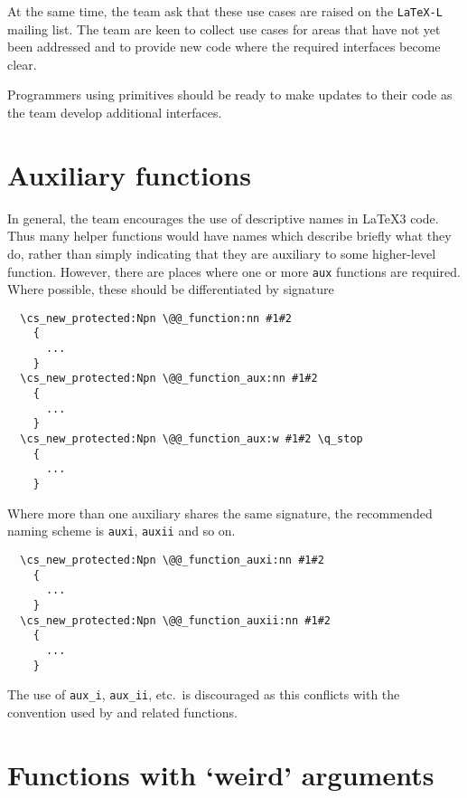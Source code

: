 \documentclass{l3doc}
\begin{document}
At the same time, the team ask that these use cases are raised on the
\texttt{LaTeX-L} mailing list. The team are keen to collect use cases for
areas that have not yet been addressed and to provide new code where the
required interfaces become clear.

Programmers using primitives should be ready to make updates to their
code as the team develop additional interfaces.

\section{Auxiliary functions}

In general, the team encourages the use of descriptive names in \LaTeX3 code.
Thus many helper functions would have names which describe briefly what they do,
rather than simply indicating that they are auxiliary to some higher-level
function. However, there are places where one or more \texttt{aux} functions
are required. Where possible, these should be differentiated by signature
\begin{verbatim}
  \cs_new_protected:Npn \@@_function:nn #1#2
    {
      ...
    }
  \cs_new_protected:Npn \@@_function_aux:nn #1#2
    {
      ...
    }
  \cs_new_protected:Npn \@@_function_aux:w #1#2 \q_stop
    {
      ...
    }
\end{verbatim}
Where more than one auxiliary shares the same signature, the recommended naming
scheme is \texttt{auxi}, \texttt{auxii} and so on.
\begin{verbatim}
  \cs_new_protected:Npn \@@_function_auxi:nn #1#2
    {
      ...
    }
  \cs_new_protected:Npn \@@_function_auxii:nn #1#2
    {
      ...
    }
\end{verbatim}
The use of \texttt{aux_i}, \texttt{aux_ii}, etc.\ is discouraged as this
conflicts with the convention used by  and related functions.

\section{Functions with `weird' arguments}
\end{document}
